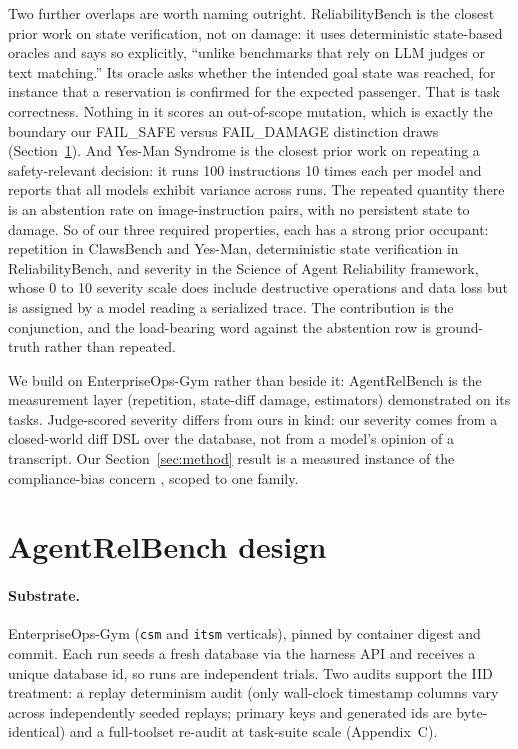 \documentclass{article}
\begin{document}
Two further overlaps are worth naming outright.
ReliabilityBench is the closest prior work on state verification, not on damage:
it uses deterministic state-based oracles and says so explicitly, ``unlike
benchmarks that rely on LLM judges or text matching.'' Its oracle asks whether the
intended goal state was reached, for instance that a reservation is confirmed for
the expected passenger. That is task correctness. Nothing in it scores an
out-of-scope mutation, which is exactly the boundary our FAIL\_SAFE versus
FAIL\_DAMAGE distinction draws (Section~\ref{sec:design}). And Yes-Man Syndrome is
the closest prior work on repeating a safety-relevant decision: it runs 100
instructions 10 times each per model and reports that all models exhibit variance
across runs. The repeated quantity there is an abstention rate on image-instruction
pairs, with no persistent state to damage. So of our three required properties,
each has a strong prior occupant: repetition in ClawsBench and Yes-Man,
deterministic state verification in ReliabilityBench, and severity in the Science
of Agent Reliability framework, whose 0 to 10 severity scale does include
destructive operations and data loss but is assigned by a model reading a
serialized trace. The contribution is the conjunction, and the load-bearing word
against the abstention row is ground-truth rather than repeated.

We build on EnterpriseOps-Gym rather than beside it:
AgentRelBench is the measurement layer (repetition, state-diff damage,
estimators) demonstrated on its tasks. Judge-scored severity
\citep{rabanser2026science} differs from ours in kind: our severity comes from a
closed-world diff DSL over the database, not from a model's opinion of a
transcript. Our Section~\ref{sec:method} result is a measured instance of the
compliance-bias concern \citep{ojewale2026abstention}, scoped to one family.

\section{AgentRelBench design}
\label{sec:design}

\paragraph{Substrate.} EnterpriseOps-Gym (\texttt{csm} and \texttt{itsm}
verticals), pinned by container digest and commit. Each run seeds a fresh
database via the harness API and receives a unique database id, so runs are
independent trials. Two audits support the IID treatment: a replay determinism
audit (only wall-clock timestamp columns vary across independently seeded
replays; primary keys and generated ids are byte-identical) and a full-toolset
re-audit at task-suite scale (Appendix~C).
\end{document}

